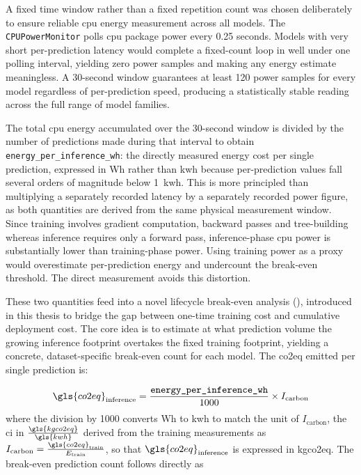 A fixed time window rather than a fixed repetition count was chosen deliberately to ensure reliable \gls{cpu} energy measurement across all models. The \texttt{CPUPowerMonitor} polls \gls{cpu} package power every 0.25 seconds. Models with very short per-prediction latency would complete a fixed-count loop in well under one polling interval, yielding zero power samples and making any energy estimate meaningless. A 30-second window guarantees at least 120 power samples for every model regardless of per-prediction speed, producing a statistically stable reading across the full range of model families.

The total \gls{cpu} energy accumulated over the 30-second window is divided by the number of predictions made during that interval to obtain \texttt{energy\_per\_inference\_wh}: the directly measured energy cost per single prediction, expressed in Wh rather than \gls{kwh} because per-prediction values fall several orders of magnitude below 1~\gls{kwh}. This is more principled than multiplying a separately recorded latency by a separately recorded power figure, as both quantities are derived from the same physical measurement window. Since training involves gradient computation, backward passes and tree-building whereas inference requires only a forward pass, inference-phase \gls{cpu} power is substantially lower than training-phase power. Using training power as a proxy would overestimate per-prediction energy and undercount the break-even threshold. The direct measurement avoids this distortion.

These two quantities feed into a novel lifecycle break-even analysis (), introduced in this thesis to bridge the gap between one-time training cost and cumulative deployment cost. The core idea is to estimate at what prediction volume the growing inference footprint overtakes the fixed training footprint, yielding a concrete, dataset-specific break-even count for each model. The \gls{co2eq} emitted per single prediction is:

\begin{equation}
\gls{co2eq}_{\text{inference}} = \frac{\texttt{energy\_per\_inference\_wh}}{1000} \times I_{\text{carbon}}
\label{eq:co2_per_inference}
\end{equation}
where the division by 1000 converts Wh to \gls{kwh} to match the unit of $I_{\text{carbon}}$, the \gls{ci} in $\frac{\gls{kgco2eq}}{\gls{kwh}}$ derived from the training measurements as $I_{\text{carbon}} = \frac{\gls{co2eq}_{\text{train}}}{E_{\text{train}}}$, so that $\gls{co2eq}_{\text{inference}}$ is expressed in \gls{kgco2eq}.
The break-even prediction count follows directly as


